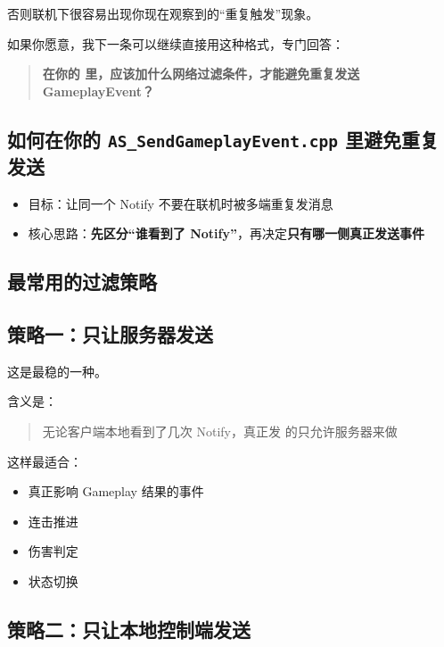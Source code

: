 否则联机下很容易出现你现在观察到的“重复触发”现象。

如果你愿意，我下一条可以继续直接用这种格式，专门回答：

\begin{quote}
	\textbf{在你的  里，应该加什么网络过滤条件，才能避免重复发送 GameplayEvent？}
\end{quote}


\subsection{如何在你的 \texttt{AS\_SendGameplayEvent.cpp} 里避免重复发送 }

\begin{itemize}
	\item 目标：让同一个 Notify 不要在联机时被多端重复发消息
	\item 核心思路：\textbf{先区分“谁看到了 Notify”}，再决定\textbf{只有哪一侧真正发送事件}
\end{itemize}

\subsection{最常用的过滤策略}

\subsection{策略一：只让服务器发送}

这是最稳的一种。

含义是：

\begin{quote}
	无论客户端本地看到了几次 Notify，真正发  的只允许服务器来做
\end{quote}

这样最适合：

\begin{itemize}
	\item 真正影响 Gameplay 结果的事件
	\item 连击推进
	\item 伤害判定
	\item 状态切换
\end{itemize}

\subsection{策略二：只让本地控制端发送}

